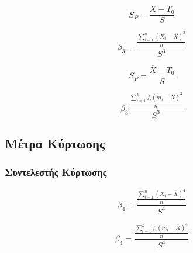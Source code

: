 \begin{multicols}{2}
  \[
S_{P}=\frac{\overline{X}-T_{0}}{S}
  \]

  \[
  \beta_{3}=\frac{\frac{\sum_{i=1}^{n}(X_{i}-\overline{X})^{3}}{n}}{S^{3}}
  \]

  \columnbreak

  \[
S_{P}=\frac{\overline{X}-T_{0}}{S}
  \]

  \[
\beta_{3}\frac{\frac{\sum_{i=1}^{k}f_{i}(m_{i}-\overline{X})^{3}}{n}}{S^{3}}
  \]

\end{multicols}


\subsection{Μέτρα Κύρτωσης}

\subsubsection{Συντελεστής Κύρτωσης}

\begin{multicols}{2}
  \[
  \beta_{4}=\frac{\frac{\sum_{i=1}^{n}(X_{i}-\overline{X})^{4}}{n}}{S^{4}}
  \]

  \[
\beta_{4}=\frac{\frac{\sum_{i=1}^{k}f_{i}(m_{i}-\overline{X})^{4}}{n}}{S^{4}}
  \]
\end{multicols}

